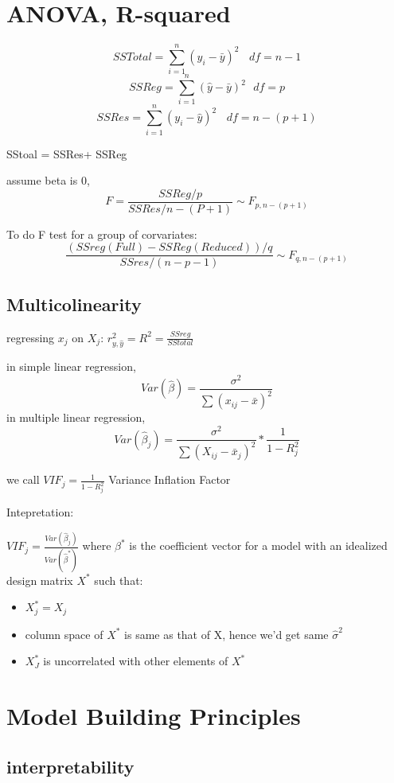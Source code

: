 \documentclass[10pt]{article}
\newcommand{\su}[2]{\sum_{#1}^{#2}}
\theoremstyle{break}
\begin{document}
     \section{ANOVA, R-squared}
     $$SSTotal=\su{i=1}{n}(y_i-\bar y)^2~~~~df=n-1$$
     $$SSReg=\su{i=1}{n}(\hat y-\bar y)^2~~~df=p$$
     $$SSRes=\su{i=1}{n}(y_i-\hat y)^2~~~~df=n-(p+1)$$

     SStoal = SSRes+ SSReg

     assume beta is 0,
     $$F=\frac{SSReg/p}{SSRes/n-(P+1)}\sim F_{p,n-(p+1)}$$

     To do F test for a group of corvariates:
     $$\frac{(SSreg(Full)-SSReg(Reduced))/q}{SSres/(n-p-1)}\sim F_{q,n-(p+1)}$$

     \subsection{Multicolinearity}
        regressing $x_j$ on $X_j$:
        $r^2_{y,\hat y}=R^2=\frac{SSreg}{SStotal}$

        in simple linear regression,
        $$Var(\hat\beta)=\frac{\sigma^2}{\sum(x_{ij}-\bar x)^2}$$
        in multiple linear regression, $$Var(\hat\beta_j)=
        \frac{\sigma^2}{\sum(X_{ij}-\bar x_j)^2}*\frac{1}{1-R_j^2}$$

        we call $VIF_j = \frac{1}{1-R_j^2}$ Variance Inflation Factor

        Intepretation:

        $VIF_j = \frac{Var(\hat\beta_j)}{Var(\hat\beta^*)}$ where $\beta^*$
        is the coefficient vector for a model with an idealized design matrix 
        $X^*$ such that:
        \begin{itemize}
            \item $X_j^*=X_j$
            \item column space of $X^*$ is same as that of X, hence we'd get same $\hat\sigma^2$
            \item $X^*_J$ is uncorrelated with other elements of $X^*$
        \end{itemize}

        \section{Model Building Principles}
            \subsection{interpretability}
\end{document}
